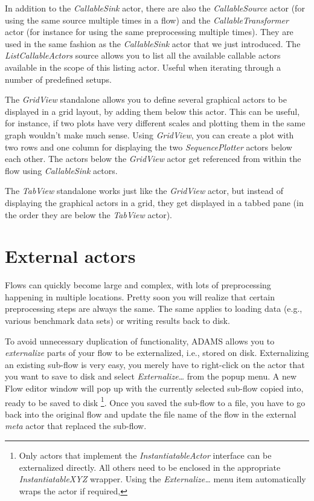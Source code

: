 In addition to the \textit{CallableSink} actor, there are also the
\textit{CallableSource} actor (for using the same source multiple times in a flow)
and the \textit{CallableTransformer} actor (for instance for using the same
preprocessing multiple times). They are used in the same fashion as the
\textit{CallableSink} actor that we just introduced. The \textit{ListCallableActors}
source allows you to list all the available callable actors available in the
scope of this listing actor. Useful when iterating through a number of predefined
setups.

The \textit{GridView} standalone allows you to define several graphical actors
to be displayed in a grid layout, by adding them below this actor. This can be 
useful, for instance, if two plots have very different scales and plotting them 
in the same graph wouldn't make much sense. Using \textit{GridView}, you can create 
a plot with two rows and one column for displaying the two \textit{SequencePlotter}
actors below each other. The actors below the \textit{GridView} actor get
referenced from within the flow using \textit{CallableSink} actors.

The \textit{TabView} standalone works just like the \textit{GridView} actor,
but instead of displaying the graphical actors in a grid, they get displayed
in a tabbed pane (in the order they are below the \textit{TabView} actor).

\newpage
\section{External actors}
\label{external_actors}
Flows can quickly become large and complex, with lots of preprocessing
happening in multiple locations. Pretty soon you will realize that certain
preprocessing steps are always the same. The same applies to loading data
(e.g., various benchmark data sets) or writing results back to disk.

To avoid unnecessary duplication of functionality, ADAMS allows you to
\textit{externalize} parts of your flow to be externalized, i.e., stored on
disk. Externalizing an existing sub-flow is very easy, you merely have to
right-click on the actor that you want to save to disk and select
\textit{Externalize\ldots} from the popup menu. A new Flow editor window will
pop up with the currently selected sub-flow copied into, ready to be saved to
disk \footnote{Only actors that implement the \textit{InstantiatableActor}
interface can be externalized directly. All others need to be enclosed in the
appropriate \textit{InstantiatableXYZ} wrapper. Using the
\textit{Externalize\ldots} menu item automatically wraps the actor if
required,}. Once you saved the sub-flow to a file, you have to go back into the
original flow and update the file name of the flow in the external \textit{meta}
actor that replaced the sub-flow.

